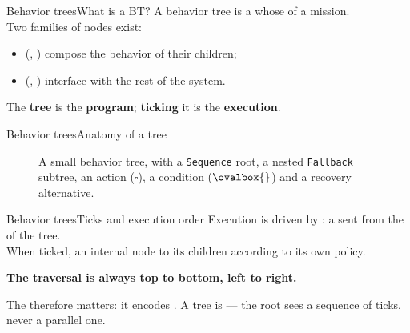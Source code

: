 \begin{frame}{Behavior trees}{What is a BT?}
  \justifying
  A behavior tree is a  whose  of a mission.\\
  \bigskip
  Two families of nodes exist:
  \begin{itemize}
    \item {} (, ) compose the behavior of their children;
    \item {} (, ) interface with the rest of the system.
  \end{itemize}
  \bigskip
  \begin{block}{}
    \centering
    The \textbf{tree} is the \textbf{program}; \textbf{ticking} it is the \textbf{execution}.
  \end{block}
\end{frame}
\begin{frame}{Behavior trees}{Anatomy of a tree}
  \begin{figure}
    \centering
    \caption{A small behavior tree, with a \texttt{Sequence} root, a nested \texttt{Fallback} subtree, an action ($\square$), a condition ($\ovalbox{\phantom{}}$) and a recovery alternative.}
  \end{figure}
\end{frame}
\begin{frame}{Behavior trees}{Ticks and execution order}
  \justifying
  Execution is driven by : a  sent from the  of the tree.\\
  \bigskip
  When ticked, an internal node  to its children according to its own policy.
  \begin{block}{}
    \centering
    \textbf{The traversal is always top to bottom, left to right.}
  \end{block}
  \bigskip
  The  therefore matters: it encodes . A tree is  --- the root sees a sequence of ticks, never a parallel one.
\end{frame}
